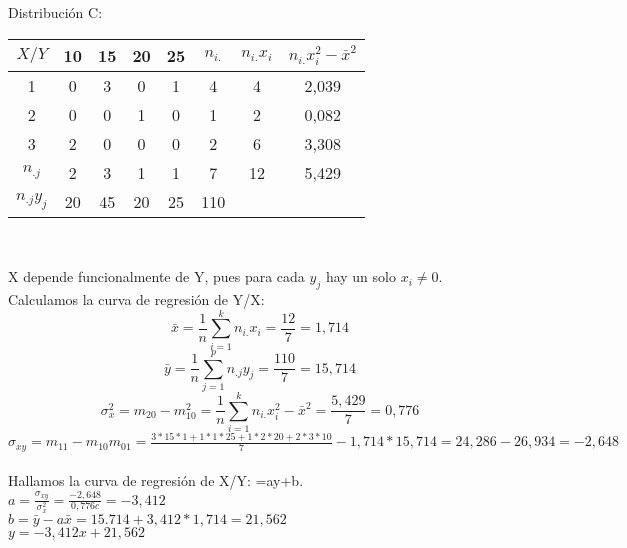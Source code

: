     Distribución C:
    \begin{center}
    \begin{tabular}{| c | c | c | c | c | c | c | c |}
        \hline
        $X / Y$ & 10 & 15 & 20 & 25 & $n_{i.}$ & $n_{i.}x_i$ & $n_{i.}x_i^2-\bar{x}^2$\\ \hline
        1 & 0 & 3 & 0 & 1 & 4 & 4 & 2,039 \\
        2 & 0 & 0 & 1 & 0 & 1 & 2 & 0,082 \\
        3 & 2 & 0 & 0 & 0 & 2 & 6 & 3,308 \\
        $n_{.j}$ & 2 & 3 & 1 & 1 & 7 & 12 & 5,429 \\
        $n_{.j}y_j$ & 20 & 45 & 20 & 25 & 110 & & \\
        \hline
    \end{tabular} \\ 
    \end{center}
    X depende funcionalmente de Y, pues para cada $y_j$ hay un solo $x_i\neq 0$. 
    Calculamos la curva de regresión de Y/X: 
    \[\bar{x} = \frac{1}{n}\sum_{i=1}^{k}n_{i.}x_i = \frac{12}{7} = 1,714 \]
    \[\bar{y} = \frac{1}{n}\sum_{j=1}^{p}n_{.j}y_j = \frac{110}{7} = 15,714 \]
    \[\sigma_x^2 = m_{20}-m_{10}^2 = \frac{1}{n}\sum_{i=1}^{k}n_{i.}x_i^2-\bar{x}^2 = \frac{5,429}{7} = 0,776\]
    $\sigma_{xy} = m_{11}-m_{10}m_{01} = \frac{3*15*1+1*1*25+1*2*20+2*3*10}{7} - 1,714*15,714 = 24,286 - 26,934 = -2,648 $ \\ \\
    Hallamos la curva de regresión de X/Y: =ay+b. \\
    $a = \frac{\sigma_{xy}}{\sigma_x^2} = \frac{-2,648}{0,776c} = -3,412$ \\
    $b = \bar{y}-a\bar{x} = 15.714 +3,412*1,714 = 21,562$ \\
    $y=-3,412x + 21,562$ \\ \\ 
